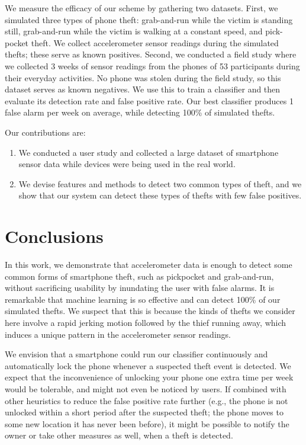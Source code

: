 We measure the efficacy of our scheme by gathering two datasets.
First, we simulated three types of phone theft: grab-and-run while the victim is standing still, grab-and-run while the victim is walking at a constant speed, and pick-pocket theft.
We collect accelerometer sensor readings during the simulated thefts; these serve as known positives.
Second, we conducted a field study where we collected 3 weeks of sensor readings from the phones of 53 participants during their everyday activities.
No phone was stolen during the field study, so this dataset serves as known negatives.
We use this to train a classifier and then evaluate its detection rate and false positive rate.
Our best classifier produces 1 false alarm per week on average, while detecting 100\% of simulated thefts.


Our contributions are:
\begin{enumerate}
  \item We conducted a user study and collected a large dataset of smartphone sensor data while devices were being used in the real world.
  \item We devise features and methods to detect two common types of theft, and we show that our system can detect these types of thefts with few false positives.
\end{enumerate}


% 
% 

\section{Conclusions}

In this work, we demonstrate that accelerometer data is enough to detect some common forms of smartphone theft, such as pickpocket and grab-and-run, without sacrificing usability by inundating the user with false alarms. 
It is remarkable that machine learning is so effective and can detect 100\% of our simulated thefts.
We suspect that this is because the kinds of thefts we consider here involve a rapid jerking motion followed by the thief running away, which induces a unique pattern in the accelerometer sensor readings.

We envision that a smartphone could run our classifier continuously and automatically lock the phone whenever a suspected theft event is detected.
We expect that the inconvenience of unlocking your phone one extra time per week would be tolerable, and might not even be noticed by users.
If combined with other heuristics to reduce the false positive rate further (e.g., the phone is not unlocked within a short period after the suspected theft; the phone moves to some new location it has never been before), it might be possible to notify the owner or take other measures as well, when a theft is detected.


